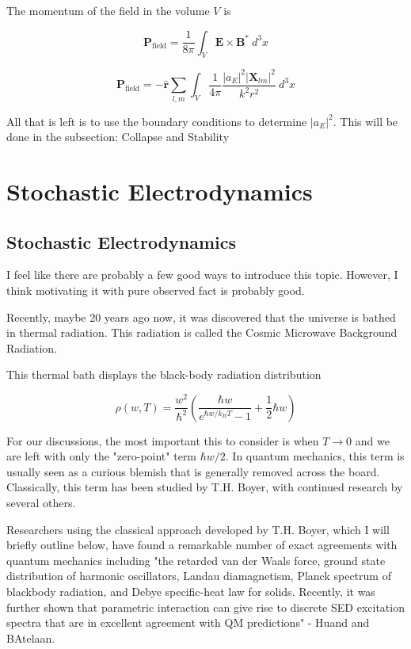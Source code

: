 \documentclass {article}
\renewcommand\vec{\mathbf}
\let\OldHat\hat
\renewcommand{\hat}[1]{\OldHat{\mathbf{#1}}}
\begin{document}
The momentum of the field in the volume $V$ is

$$\vec P_{\text{field}} = \frac 1 {8 \pi} \int_V \vec E \times \vec B^* ~ d^3x$$ 

$$\vec P_{\text{field}} = - \hat r \sum_{l, m}   \int_V \frac 1 {4 \pi}  \frac {|a_E|^2 |\vec X_{lm} |^2}{k^2 r^2} ~ d^3x $$

All that is left is to use the boundary conditions to determine $|a_E|^2$. This will be done in the subsection: Collapse and Stability


\newpage

\section{Stochastic Electrodynamics}
\subsection{Stochastic Electrodynamics}
I feel like there are probably a few good ways to introduce this topic. However, I think motivating it with pure observed fact is probably good.

Recently, maybe 20 years ago now, it was discovered that the universe is bathed in thermal radiation. This radiation is called the Cosmic Microwave Background Radiation. 

This thermal bath displays the black-body radiation distribution

$$\rho(w, T) = \frac {w^2} {\hbar^2} \left( \frac{ \hbar w}{e^{\hbar w / k_B T} - 1} + \frac 1 2 \hbar w    \right)$$

For our discussions, the most important this to consider is when $T \rightarrow 0$ and we are left with only the "zero-point" term $\hbar w / 2$. In quantum mechanics, this term is usually seen as a curious blemish that is generally removed across the board. Classically, this term has been studied by T.H. Boyer, with continued research by several others.

Researchers using the classical approach developed by T.H. Boyer, which I will briefly outline below, have found a remarkable number of exact agreements with quantum mechanics including "the retarded van der Waals force, ground state distribution of harmonic oscillators, Landau diamagnetism, Planck spectrum of blackbody radiation, and Debye specific-heat law for solids. Recently, it was further shown that parametric interaction can give rise to discrete SED excitation spectra that are in excellent agreement with QM predictions" - Huand and BAtelaan. 
\end{document}

